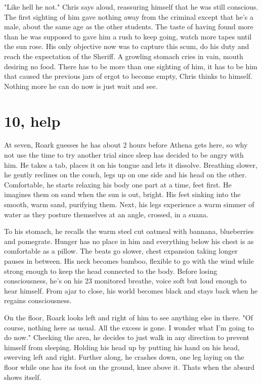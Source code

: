         "Like hell he not." Chris says aloud, reassuring himself that he was still conscious. The first sighting of him gave nothing away from
    the criminal except that he's a male, about the same age as the other students. The taste of having found more than he was supposed to gave
    him a rush to keep going, watch more tapes until the sun rose. His only objective now was to capture this scum, do his duty and reach
    the expectation of the Sheriff. A growling stomach cries in vain, mouth desiring no food. There has to be more than one sighting of him,
    it has to be him that caused the previous jars of ergot to become empty, Chris thinks to himself. Nothing more he can do now is just wait
    and see.

\section{10, help}

        At seven, Roark guesses he has about 2 hours before Athena gets here, so why not use the time to try another trial since sleep has
    decided to be angry with him. He takes a tab, places it on his tongue and lets it dissolve. Breathing slower, he gently reclines on the couch,
    legs up on one side and his head on the other. Comfortable, he starts relaxing his body one part at a time, feet first. He imagines them on
    sand when the sun is out, bright. His feet sinking into the smooth, warm sand, purifying them. Next, his legs experience a warm simmer of
    water as they posture themselves at an angle, crossed, in a suana. 

        To his stomach, he recalls the warm steel cut oatmeal with bannana, blueberries and pomegrate. Hunger has no place in him and everything
    below his chest is as comfortable as a pillow. The beats go slower, chest expansion taking longer pauses in between. His neck becomes bamboo,
    flexible to go with the wind while strong enough to keep the head connected to the body. Before losing consciousness, he's on his 23 monitored
    breathe, voice soft but loud enough to hear himself. From ajar to close, his world becomes black and stays back when he regains consciousness.

        On the floor, Roark looks left and right of him to see anything else in there. "Of course, nothing here as usual. All the excess is gone.
    I wonder what I'm going to do now." Checking the area, he decides to just walk in any direction to prevent himself from sleeping. Holding his
    head up by putting his hand on his head, swerving left and right. Further along, he crashes down, one leg laying on the floor while one has
    its foot on the ground, knee above it. Thats when the absurd shows itself.

